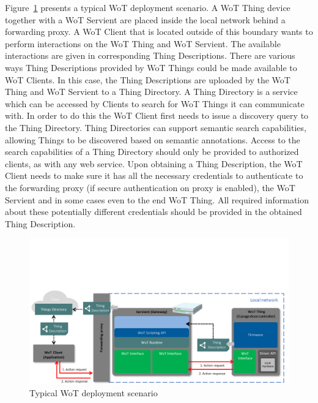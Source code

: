 
Figure~\ref{fig-wot-scenario} presents a typical WoT deployment scenario. 
A WoT Thing device together with a WoT Servient are placed inside 
the local network behind a forwarding proxy. 
A WoT Client that is located outside of this boundary wants to 
perform interactions on the WoT Thing and WoT Servient.
The available interactions are given in corresponding Thing Descriptions.
There are various ways Thing Descriptions provided by WoT Things
could be made available to WoT Clients.
In this case, the Thing Descriptions are 
uploaded by the WoT Thing and WoT Servient to a Thing Directory.
A Thing Directory is a service which can be accessed by Clients
to search for WoT Things it can communicate with.
In order to do this the WoT Client first needs to issue a 
discovery query to the Thing Directory.
Thing Directories can support semantic search capabilities, allowing
Things to be discovered based on semantic annotations. 
Access to the search capabilities of a Thing Directory should
only be provided to authorized clients, as with any web service.
Upon obtaining a Thing Description, 
the WoT Client needs to make sure it has all the necessary credentials
to authenticate to the forwarding proxy 
(if secure authentication on proxy is enabled), 
the WoT Servient and in some cases even to the end WoT Thing.
All required information about these potentially different 
credentials should be provided in the obtained Thing Description.  

\begin{figure}[!t]
\centering
\includegraphics[width=6in]{figures/wot-scenario.png}
\caption{Typical WoT deployment scenario}
\label{fig-wot-scenario}
\end{figure}

